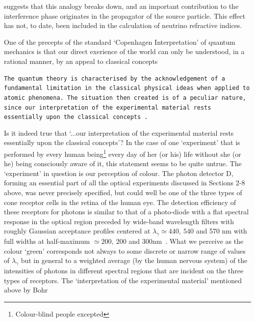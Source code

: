 \documentclass [12pt]{article}
\begin{document}
{\begin{itemize}
   suggests that this analogy breaks down, and an important contribution to the interference
 phase originates in the propagator of the source particle. This effect has not, to date, been included
  in the calculation of neutrino refractive indices.
  \end{itemize}
  \par One of the precepts of the standard `Copenhagen Interpretation' of quantum mechanics is that our direct
  exerience of the world can only be understood, in a rational manner, by an appeal to classical concepts
  \par{\tt The quantum theory is characterised by the acknowledgement of a \newline fundamental limitation in the
   classical physical ideas when applied to \newline atomic phenomena. The situation then created is of a peculiar
   nature, \newline since our interpretation of the experimental material rests essentially \newline upon the
   classical concepts
    \cite{BohrCI}.}
     \par Is it indeed true that `...our interpretation of the experimental material
      rests essentially upon the classical concepts'? In the case of one `experiment' that is performed
   by every human being\footnote{Colour-blind people excepted} every day of her (or his) life
     without she (or he) being consciously aware of it,
   this statement seems to be quite untrue. 
     The `experiment' in question is our perception of colour.
    The photon detector D, forming an essential part of all the optical experiments discussed in Sections 2-8
     above, was never precisely specified, but could well be one of the three types of cone receptor cells
    in the retina of the human eye. The detection efficiency of these receptors for photons is similar
    to that of a photo-diode with a flat spectral response in the optical region preceded 
    by wide-band wavelength filters with roughly Gaussian acceptance profiles centered at $\lambda_{\gamma}
    \simeq 440,~540$ and 570 nm with full widths at half-maximum $ \simeq 200,~200$ and 300nm~\cite{PD92}.
     What we perceive as the colour `green' corresponds not always to some discrete or narrow range of
    values of  $\lambda_{\gamma}$ but in general to a weighted average (by the human nervous system)
     of the intensities of photons in different spectral regions that are incident on the three
    types of receptors. The `interpretation of the experimental material' mentioned above by Bohr
}
\end{document}
